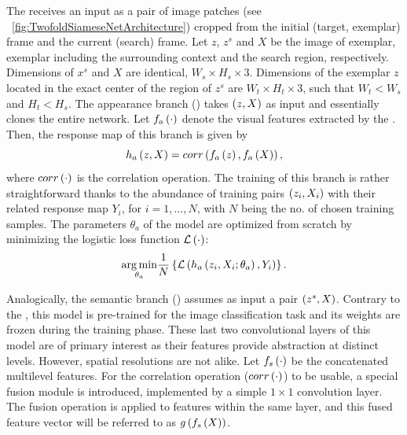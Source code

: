 The \sasiam{} receives an input as a pair of image patches (see \figstr{}~\ref{fig:TwofoldSiameseNetArchitecture}) cropped from the initial (target, exemplar) frame and the current (search) frame. Let $z$, $z^s$ and $X$ be the image of exemplar, exemplar including the surrounding context and the search region, respectively. Dimensions of $x^s$ and $X$ are identical, $W_s \times H_s \times 3$. Dimensions of the exemplar $z$ located in the exact center of the region of $z^s$ are $W_t \times H_t \times 3$, such that $W_t < W_s$ and $H_t < H_s$. The appearance branch (\anet{}) takes $\left( {z, X} \right)$ as input and essentially clones the entire \siamfc{} network. Let ${f_a} \left( \cdot \right)$ denote the visual features extracted by the \anet{}. Then, the response map of this branch is given by
\begin{equation}
    {h_a} \left( z, X \right) = {corr} \left( {f_a} \left( z \right), {f_a} \left( X \right) \right),
\end{equation}
where ${corr} \left( \cdot \right)$ is the correlation operation. The training of this branch is rather straightforward thanks to the abundance of training pairs $\left( {z_i, X_i} \right)$ with their related response map $Y_i$, for $i = 1, \dots, N$, with $N$ being the no. of chosen training samples. The parameters $\theta_a$ of the \anet{} model are optimized from scratch by minimizing the logistic loss function ${\mathcal{L}} \left( \cdot \right)$:
\begin{equation}
    \label{eq:ANetModelTraining}
    \underset{\theta_a}{\operatorname*{arg\,min}}
    \frac{1}{N}
    \left\{ {
        {\mathcal{L}} \left( 
            {h_a} \left( z_i, X_i; \theta_a \right),
            Y_i
         \right)
    } \right\}.
\end{equation}

Analogically, the semantic branch (\snet{}) assumes as input a pair $\left( {z^s, X} \right)$. Contrary to the \anet{}, this model is pre-trained for the image classification task and its weights are frozen during the training phase. These last two convolutional layers of this model are of primary interest as their features provide abstraction at distinct levels. However, spatial resolutions are not alike. Let ${f_s} \left( \cdot \right)$ be the concatenated multilevel features. For the correlation operation (${corr} \left( \cdot \right)$) to be usable, a special fusion module is introduced, implemented by a simple $1 \times 1$ convolution layer. The fusion operation is applied to features within the same layer, and this fused feature vector will be referred to as ${g} \left( {f_s} \left( X \right) \right)$.

